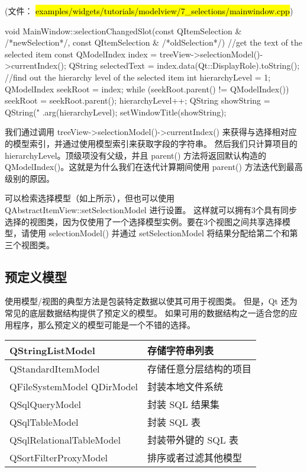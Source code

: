 (文件： \hl{examples/widgets/tutorials/modelview/7\_selections/mainwindow.cpp})

\begin{cppcode}
void MainWindow::selectionChangedSlot(const QItemSelection & /*newSelection*/, const QItemSelection & /*oldSelection*/)
{
    //get the text of the selected item
    const QModelIndex index = treeView->selectionModel()->currentIndex();
    QString selectedText = index.data(Qt::DisplayRole).toString();
    //find out the hierarchy level of the selected item
    int hierarchyLevel = 1;
    QModelIndex seekRoot = index;
    while (seekRoot.parent() != QModelIndex()) {
        seekRoot = seekRoot.parent();
        hierarchyLevel++;
    }
    QString showString = QString("%
                         .arg(hierarchyLevel);
    setWindowTitle(showString);
}
\end{cppcode}

我们通过调用 treeView->selectionModel()->currentIndex() 来获得与选择相对应的模型索引，并通过使用模型索引来获取字段的字符串。
然后我们只计算项目的hierarchyLevel。顶级项没有父级，并且 parent() 方法将返回默认构造的 QModelIndex()。这就是为什么我们在迭代计算期间使用 parent() 方法迭代到最高级别的原因。

可以检索选择模型（如上所示），但也可以使用 QAbstractItemView::setSelectionModel 进行设置。
这样就可以拥有3个具有同步选择的视图类，因为仅使用了一个选择模型实例。要在3个视图之间共享选择模型，请使用 selectionModel() 并通过 setSelectionModel 将结果分配给第二个和第三个视图类。

\subsection{预定义模型}

使用模型/视图的典型方法是包装特定数据以使其可用于视图类。
但是，Qt 还为常见的底层数据结构提供了预定义的模型。
如果可用的数据结构之一适合您的应用程序，那么预定义的模型可能是一个不错的选择。

\begin{longtable}{|l|l|}
\hline
QStringListModel &	存储字符串列表 \\ 
\hline
QStandardItemModel &	存储任意分层结构的项目\\
\hline
QFileSystemModel
QDirModel	 & 封装本地文件系统\\ 
\hline
QSqlQueryModel &	封装 SQL 结果集\\
\hline
QSqlTableModel	& 封装 SQL 表\\
\hline
QSqlRelationalTableModel &	封装带外键的 SQL 表 \\
\hline
QSortFilterProxyModel	& 排序或者过滤其他模型 \\
\hline
\end{longtable}

